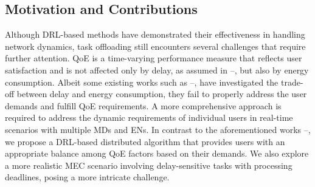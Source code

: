 \documentclass[12pt,draftclsnofoot,onecolumn]{IEEEtran}
\begin{document}
\subsection{Motivation and Contributions}
Although DRL-based methods have demonstrated their effectiveness in handling network dynamics, task offloading still encounters several challenges that require further attention. 
QoE is a time-varying performance measure that reflects user satisfaction and is not affected only by delay, as assumed in \cite{huang2019deep}--\cite{sun2024hierarchical}, but also by energy consumption. Albeit some existing works such as \cite{dai2020edge}--\cite{liao2023online}, have investigated the trade-off between delay and energy consumption, they fail to properly address the user demands and fulfill QoE requirements. A more comprehensive approach is required to address the dynamic requirements of individual users in real-time scenarios with multiple MDs and ENs.  In contrast to the aforementioned works \cite{huang2019deep}--\cite{liao2023online}, we propose a DRL-based distributed algorithm that provides users with an appropriate balance among QoE factors based on their  demands. We also explore a more realistic MEC scenario involving delay-sensitive tasks with processing deadlines, posing a more intricate challenge.


\end{document}
